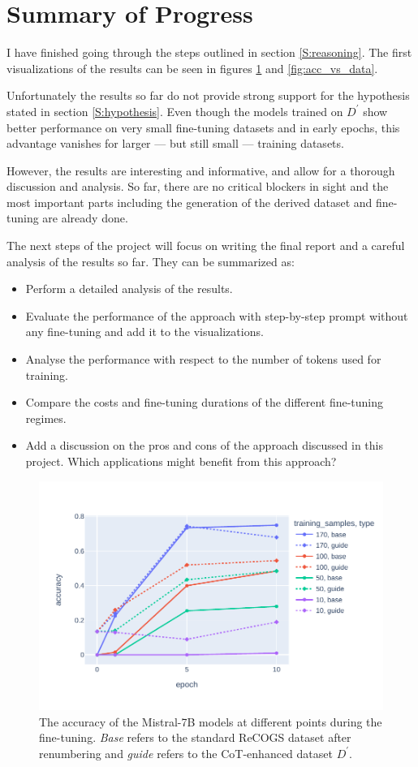 \documentclass[11pt]{article}
\begin{document}
    \section{Summary of Progress}

    I have finished going through the steps outlined in section \ref{S:reasoning}. The first visualizations of the results
    can be seen in figures \ref{fig:acc_vs_epoch} and \ref{fig:acc_vs_data}.

    Unfortunately the results so far do not provide strong support for the hypothesis stated in section \ref{S:hypothesis}.
    Even though the models trained on $D^\prime$ show better performance on very small fine-tuning datasets and in early
    epochs, this advantage vanishes for larger --- but still small --- training datasets.

    However, the results are interesting and informative, and allow for a thorough discussion and analysis.
    So far, there are no critical blockers in sight and the most important parts including the generation of the derived
    dataset and fine-tuning are already done.

    The next steps of the project will focus on writing the final report and a careful analysis of the results so far.
    They can be summarized as:
    \begin{itemize}
        \item Perform a detailed analysis of the results.
        \item Evaluate the performance of the approach with step-by-step prompt without any fine-tuning
        and add it to the visualizations.
        \item Analyse the performance with respect to the number of tokens used for training.
        \item Compare the costs and fine-tuning durations of the different fine-tuning regimes.
        \item Add a discussion on the pros and cons of the approach discussed in this project. Which applications might
        benefit from this approach?
    \end{itemize}

    \begin{figure}
        \centering
        \includegraphics[width=0.45\columnwidth]{../plots/accuracy_vs_epoch.pdf}
        \caption{The accuracy of the Mistral-7B models at different points during the fine-tuning.
        \emph{Base} refers to the standard ReCOGS dataset after renumbering and \emph{guide}
        refers to the CoT-enhanced dataset $D^\prime$.
        }
        \label{fig:acc_vs_epoch}
    \end{figure}
\end{document}
